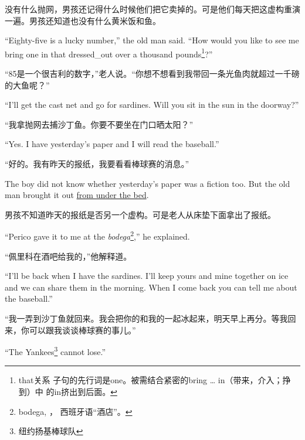 \begin{paracol}{2}
没有什么抛网，男孩还记得什么时候他们把它卖掉的。可是他们每天把这虚构重演一遍。男孩还知道也没有什么黄米饭和鱼。

\switchcolumn*

``Eighty-five is a lucky number,'' the old man said. ``How would you like to
see me bring one in that \gls{dressed_out} over a thousand \glspl{pound}\footnote{that关系
  子句的先行词是one。被需结合紧密的bring \ldots{} in（带来，介入；挣到）中
  的in挤出到后面。}?''

\switchcolumn

“85是一个很吉利的数字，”老人说。“你想不想看到我带回一条光鱼肉就超过一千磅的大鱼呢？”

\switchcolumn*

``I'll get the cast net and go for sardines. Will you sit in the sun in the \gls{doorway}?''

\switchcolumn

“我拿抛网去捕沙丁鱼。你要不要坐在门口晒太阳？”

\switchcolumn*

``Yes. I have yesterday's paper and I will read the baseball.''

\switchcolumn

“好的。我有昨天的报纸，我要看看棒球赛的消息。”

\switchcolumn*

The boy did not know whether yesterday's paper was a fiction too. But the
old man brought it out \uline{from under the bed}.

\switchcolumn

男孩不知道昨天的报纸是否另一个虚构。可是老人从床垫下面拿出了报纸。

\switchcolumn*

``Perico gave it to me at the \emph{bodega}\footnote{bodega, ，
  西班牙语“酒店”。},'' he explained.

\switchcolumn

“佩里科在酒吧给我的，”他解释道。

\switchcolumn*

``I'll be back when I have the sardines. I'll keep yours and mine together
on ice and we can share them in the morning. When I come back you can tell
me about the baseball.''

\switchcolumn

“我一弄到沙丁鱼就回来。我会把你的和我的一起冰起来，明天早上再分。等我回来，你可以跟我谈谈棒球赛的事儿。”

\switchcolumn*

``The Yankees\footnote{纽约扬基棒球队} cannot lose.''


\end{paracol}
